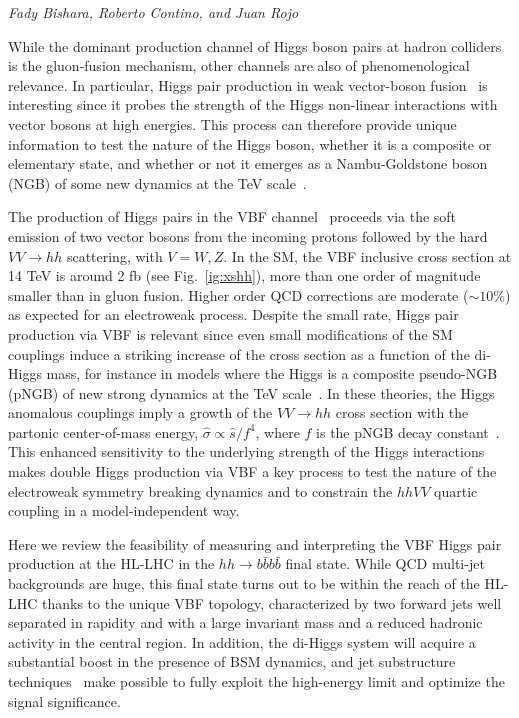 \begin{center}
\textit{Fady Bishara, Roberto Contino, and Juan Rojo}
\end{center}

While the dominant production channel of Higgs boson pairs at hadron colliders is the gluon-fusion mechanism, other channels are also of phenomenological relevance. In particular, Higgs pair production in weak vector-boson fusion~\cite{Bishara:2016kjn} is interesting since it probes the
strength of the  Higgs non-linear interactions with vector bosons at high
energies. This process can therefore provide unique information
to test the nature of the Higgs boson,
whether it is a composite or elementary state, and whether or not it emerges as
a Nambu-Goldstone boson (NGB) of some new dynamics at the TeV
scale~\cite{Giudice:2007fh,Contino:2010mh,Contino:2013gna}.

The production of Higgs pairs in the  VBF
channel~\cite{Giudice:2007fh,Contino:2010mh,Dolan:2013rja,Brooijmans:2014eja,Liu-Sheng:2014gxa,Dolan:2015zja} proceeds via the soft emission of two vector bosons from the incoming protons  followed by 
the hard $VV \to hh$ scattering, with $V=W,Z$.
%
In the SM, the VBF inclusive cross section
at 14 TeV is around 2 fb (see Fig.~\ref{ig:xshh}), more than one
order of magnitude smaller than in gluon fusion.
Higher order QCD corrections are moderate ($\sim 10\%$) as
expected for an electroweak process.
%
Despite the small rate, Higgs pair production via VBF is relevant since
even small modifications of the SM couplings induce a striking increase of the
cross section as a function of the di-Higgs mass, for instance in models 
where the Higgs is a composite pseudo-NGB (pNGB) of new strong dynamics at the TeV scale~\cite{Kaplan:1983fs}.
%
In these theories, the Higgs anomalous couplings imply a growth of the $VV\to hh$ cross section with the
partonic center-of-mass energy, $\hat{\sigma} \propto \hat s/f^4$, where $f$ is the pNGB decay constant~\cite{Giudice:2007fh}.
%
This enhanced sensitivity to the underlying strength of the Higgs interactions makes 
double Higgs production via VBF a key process to test the nature of the
electroweak symmetry breaking dynamics
and to constrain the $hhVV$ quartic coupling in a model-independent way.

Here we review the feasibility of measuring and interpreting
the VBF Higgs pair production at the HL-LHC in
 the $hh\to b\bar{b}b\bar{b}$ final state.
 While QCD multi-jet backgrounds are huge, this final state turns out
 to be within the reach of the HL-LHC thanks to the unique VBF topology,
characterized by two forward jets well separated in rapidity and with a large
invariant mass and a reduced hadronic activity in the central region. 
In addition, the di-Higgs system will acquire a substantial boost
in the presence of BSM dynamics, and jet
substructure techniques~\cite{Salam:2009jx,Gouzevitch:2013qca,Behr:2015oqq} 
make possible to fully exploit the
high-energy limit and optimize the signal significance.

